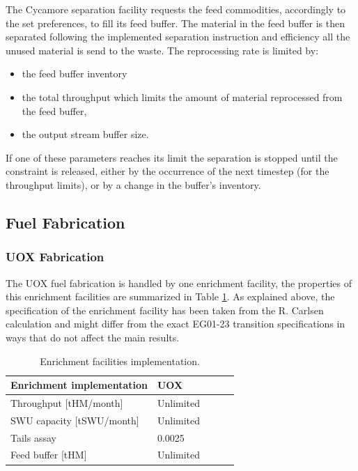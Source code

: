 \documentclass[12pt]{article}
\begin{document}
The Cycamore separation facility requests the feed commodities, accordingly to the
set preferences, to fill its feed buffer. The material in the feed buffer is then
separated following the implemented separation instruction and efficiency all the
unused material is send to the waste. The reprocessing rate is limited by:

\begin{itemize}

  \item the feed buffer inventory
  \item the total throughput which limits the amount of material reprocessed from
    the feed buffer,
  \item the output stream buffer size.

\end{itemize}
If one of these parameters reaches its limit the separation is stopped until the
constraint is released, either by the occurrence of the next timestep (for the
throughput limits), or by a change in the buffer's inventory. 

\subsection{Fuel Fabrication}

\subsubsection{UOX Fabrication}

The UOX fuel fabrication is handled by one enrichment facility, the properties
of this enrichment facilities are summarized in Table \ref{tab:enrich_1}. As
explained above, the specification of the enrichment facility has been taken from the
R. Carlsen calculation and might differ from the exact EG01-23 transition
specifications in ways that do not affect the main results.

\begin{table}[h!]
    \centering
    \begin{tabular}{lllll}
    \hline
    Enrichment implementation  &  UOX        \\
    \hline
    Throughput [tHM/month]     &  Unlimited  \\
    SWU capacity [tSWU/month]  &  Unlimited  \\
    Tails assay                &  0.0025     \\
    Feed buffer [tHM]          &  Unlimited  \\
    \hline
    \end{tabular}
    \caption{Enrichment facilities implementation. }
    \label{tab:enrich_1}
\end{table}
\end{document}
